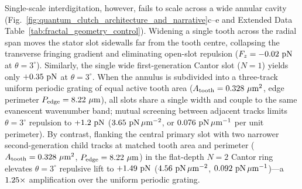\documentclass[pdflatex,sn-nature]{sn-jnl}
\DeclareRobustCommand{\roundtwo}[1]{\fpeval{round(#1,2)}}
\DeclareRobustCommand{\roundthree}[1]{\fpeval{round(#1,3)}}
\begin{document}
Single-scale interdigitation, however, fails to scale across a wide annular cavity (Fig.~\ref{fig:quantum_clutch_architecture_and_narrative}c--e and Extended Data Table~\ref{tab:fractal_geometry_control}). Widening a single tooth across the radial span moves the stator slot sidewalls far from the tooth centre, collapsing the transverse fringing gradient and eliminating open-slot repulsion ($F_z = \roundtwo{\CtrlSinglewideBemThetathreeFZPn}\text{ pN}$ at $\theta=3^\circ$). Similarly, the single wide first-generation Cantor slot ($N=1$) yields only $+\roundtwo{\FractalNoneFundringBemThetathreeFZPn}\text{ pN}$ at $\theta=3^\circ$. When the annulus is subdivided into a three-track uniform periodic grating of equal active tooth area ($A_{\rm tooth} = \roundthree{\FractalCtrlUniformperiodicActiveToothAreaUmtwo}\ \mu\text{m}^2$, edge perimeter $P_{\rm edge} = \roundtwo{\FractalCtrlUniformperiodicEdgePerimeterUm}\ \mu\text{m}$), all slots share a single width and couple to the same evanescent wavenumber band; mutual screening between adjacent tracks limits $\theta=3^\circ$ repulsion to $+\roundtwo{\CtrlUniformperiodicBemThetathreeFZPn}\text{ pN}$ ($\roundtwo{\NatureCtrlUniformperiodicFRepPnPerToothAreaUmtwo}\text{ pN}\,\mu\text{m}^{-2}$, or $\roundthree{\FractalCtrlUniformperiodicFRepPnPerUm}\text{ pN}\,\mu\text{m}^{-1}$ per unit perimeter). By contrast, flanking the central primary slot with two narrower second-generation child tracks at matched tooth area and perimeter ($A_{\rm tooth} = \roundthree{\FractalCantorFlatzActiveToothAreaUmtwo}\ \mu\text{m}^2$, $P_{\rm edge} = \roundtwo{\FractalCantorFlatzEdgePerimeterUm}\ \mu\text{m}$) in the flat-depth $N=2$ Cantor ring elevates $\theta=3^\circ$ repulsive lift to $+\roundtwo{\CantorNtwoFlatzBemThetathreeFZPn}\text{ pN}$ ($\roundtwo{\NatureCantorNtwoFlatzFRepPnPerToothAreaUmtwo}\text{ pN}\,\mu\text{m}^{-2}$, $\roundthree{\FractalCantorFlatzFRepPnPerUm}\text{ pN}\,\mu\text{m}^{-1}$)---a $1.25{}\times$ amplification over the uniform periodic grating.
\end{document}
